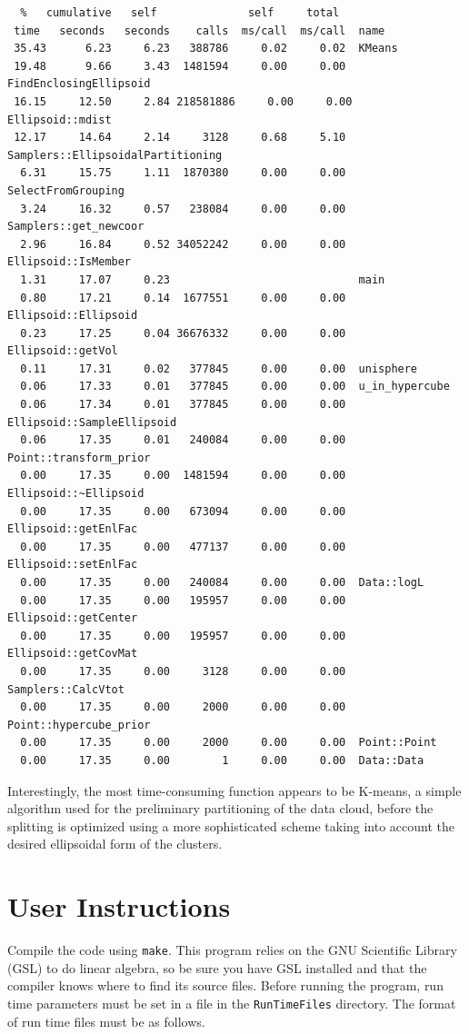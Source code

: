 \documentclass{article}
\begin{document}
\begin{verbatim}
  %   cumulative   self              self     total           
 time   seconds   seconds    calls  ms/call  ms/call  name    
 35.43      6.23     6.23   388786     0.02     0.02  KMeans
 19.48      9.66     3.43  1481594     0.00     0.00  FindEnclosingEllipsoid
 16.15     12.50     2.84 218581886     0.00     0.00  Ellipsoid::mdist
 12.17     14.64     2.14     3128     0.68     5.10  Samplers::EllipsoidalPartitioning
  6.31     15.75     1.11  1870380     0.00     0.00  SelectFromGrouping
  3.24     16.32     0.57   238084     0.00     0.00  Samplers::get_newcoor
  2.96     16.84     0.52 34052242     0.00     0.00  Ellipsoid::IsMember
  1.31     17.07     0.23                             main
  0.80     17.21     0.14  1677551     0.00     0.00  Ellipsoid::Ellipsoid
  0.23     17.25     0.04 36676332     0.00     0.00  Ellipsoid::getVol
  0.11     17.31     0.02   377845     0.00     0.00  unisphere
  0.06     17.33     0.01   377845     0.00     0.00  u_in_hypercube
  0.06     17.34     0.01   377845     0.00     0.00  Ellipsoid::SampleEllipsoid
  0.06     17.35     0.01   240084     0.00     0.00  Point::transform_prior
  0.00     17.35     0.00  1481594     0.00     0.00  Ellipsoid::~Ellipsoid
  0.00     17.35     0.00   673094     0.00     0.00  Ellipsoid::getEnlFac
  0.00     17.35     0.00   477137     0.00     0.00  Ellipsoid::setEnlFac
  0.00     17.35     0.00   240084     0.00     0.00  Data::logL
  0.00     17.35     0.00   195957     0.00     0.00  Ellipsoid::getCenter
  0.00     17.35     0.00   195957     0.00     0.00  Ellipsoid::getCovMat
  0.00     17.35     0.00     3128     0.00     0.00  Samplers::CalcVtot
  0.00     17.35     0.00     2000     0.00     0.00  Point::hypercube_prior
  0.00     17.35     0.00     2000     0.00     0.00  Point::Point
  0.00     17.35     0.00        1     0.00     0.00  Data::Data
\end{verbatim}
Interestingly, the most time-consuming function appears to be K-means, a simple algorithm used for the preliminary partitioning of the data cloud, before the splitting is optimized using a more sophisticated scheme taking into account the desired ellipsoidal form of the clusters.
\section{User Instructions}
Compile the code using {\tt make}.  This program relies on the GNU Scientific Library (GSL) to do linear algebra, so be sure  you have GSL installed and that the compiler knows where to find its source files. Before running the program, run time parameters must be set in a file in the {\tt RunTimeFiles} directory. The format of run time files must be as follows. 
\end{document}
